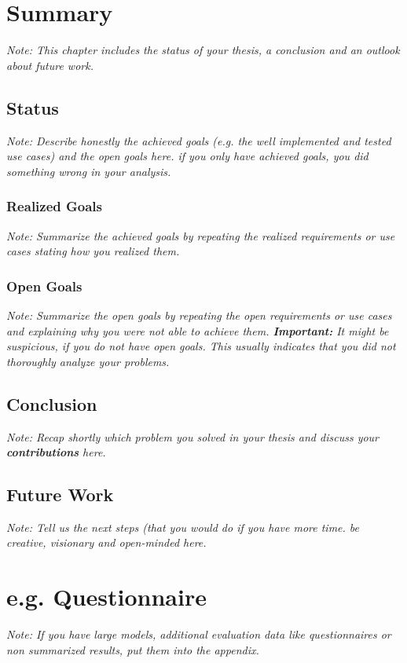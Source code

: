 \documentclass[a4paper,12pt,twoside]{report}
\begin{document}

\chapter{Summary}

\textit{Note: This chapter includes the status of your thesis, a conclusion and an outlook about future work.}

\section{Status}

\textit{Note: Describe honestly the achieved goals (e.g. the well implemented and tested use cases) and the open goals here. if you only have achieved goals, you did something wrong in your analysis.}

\subsection{Realized Goals}

\textit{Note: Summarize the achieved goals by repeating the realized requirements or use cases stating how you realized them.}

\subsection{Open Goals}

\textit{Note: Summarize the open goals by repeating the open requirements or use cases and explaining why you were not able to achieve them. \textbf{Important:} It might be suspicious, if you do not have open goals. This usually indicates that you did not thoroughly analyze your problems.}

\section{Conclusion}

\textit{Note: Recap shortly which problem you solved in your thesis and discuss your \textbf{contributions} here.}

\section{Future Work}

\textit{Note: Tell us the next steps  (that you would do if you have more time. be creative, visionary and open-minded here.}



\appendix

\chapter{e.g. Questionnaire}

\textit{Note: If you have large models, additional evaluation data like questionnaires or non summarized results, put them into the appendix.}


\clearpage

\listoffigures
\clearpage

\listoftables
\clearpage



\end{document}
